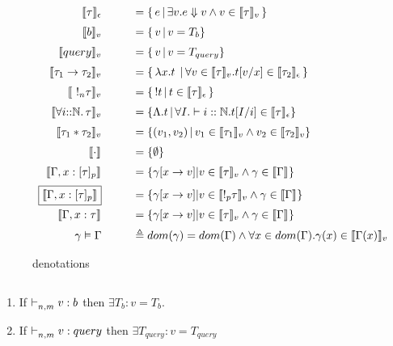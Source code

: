 \documentclass[a4paper,11pt]{article}
\theoremstyle{definition}
\begin{document}
\begin{figure*}[h]
$$
\begin{array}{rcl}
      \llbracket {\tau} \rrbracket_{\epsilon}  &\quad &  = \{ \, e \, | \, \exists v. e \Downarrow v \land v \in   \llbracket {\tau} \rrbracket_{v} \,  \}  \\[2mm]
      \llbracket {b} \rrbracket_{v} &\quad &  = \{ \,  v  \, | \, v = T_b \}  \\[2mm]
      \llbracket {query} \rrbracket_{v} &\quad &  = \{ \,  v \, |  \, v = T_{query} \}  \\[2mm]
      \llbracket {\tau_1 \rightarrow \tau_2} \rrbracket_{v} & \quad & = \{\, \mathrel { \lambda {x} . {t} } \, | \, \forall v \in\llbracket {\tau} \rrbracket_{v}. t[v/x] \in \llbracket {\tau_2} \rrbracket_{\epsilon} \, \} \\[2mm]
      \llbracket { \ !_n \tau} \rrbracket_{v} & \quad & = \{\, !t \, | \, t \in \llbracket {\tau} \rrbracket_{\epsilon} \, \} \\[2mm]
      \llbracket {\forall i{::}\mathbb{N}.\,{\tau}} \rrbracket_{v}  & \quad & = \{  \Lambda. t \, | \, \forall I. \vdash i :: \mathbb{N}. t[I/i] \in \llbracket {\tau} \rrbracket_{\epsilon}   \}  \\[2mm]
      \llbracket {\tau_1 * \tau_2} \rrbracket_{v}  & \quad & = \{  (v_1, v_2) \, | \, v_1 \in \llbracket {\tau_1} \rrbracket_{v} \land v_2 \in \llbracket {\tau_2} \rrbracket_{v}     \} \\[2mm]
      \llbracket {\cdot} \rrbracket_{} &\quad & = \{ \emptyset \} \\[2mm]
      \llbracket {\Gamma, x : [\tau]_p} \rrbracket_{} & \quad & = \{ \gamma[x \rightarrow v] | v \in \llbracket {\tau} \rrbracket_{v} \land \gamma \in \llbracket {\Gamma} \rrbracket_{}   \}  \\ [2mm]
      \boxed{\llbracket {\Gamma, x : [\tau]_p} \rrbracket_{}}  & \quad & = \{ \gamma[x \rightarrow v] | v \in \llbracket {!_p \tau} \rrbracket_{v}  \land \gamma \in \llbracket {\Gamma} \rrbracket_{}   \}  \\ [2mm]
      \llbracket {\Gamma, x : \tau} \rrbracket_{} & \quad & = \{ \gamma[x \rightarrow v] | v \in \llbracket {\tau} \rrbracket_{v} \land \gamma \in \llbracket {\Gamma} \rrbracket_{}   \}  \\ [2mm]
      \gamma \vDash \Gamma &\quad & \triangleq dom(\gamma) = dom(\Gamma) \land \forall x \in dom(\Gamma). \gamma(x) \in \llbracket {\Gamma(x)} \rrbracket_{v}
\end{array}
$$
\caption{denotations}
\end{figure*}


\clearpage
\begin{lem} $ $
	\label{lem:1}
    \begin{enumerate}
\item If $\mathrel{\vdash_{n,m}^{} {v} : {b}} $ then $ \exists T_{b} : v = T_{b}$.\\
\item If $\mathrel{\vdash_{n,m}^{} {v} : {query}} $ then $ \exists T_{query} : v = T_{query}$
\end{enumerate}
	
	
\end{lem}
\end{document}
